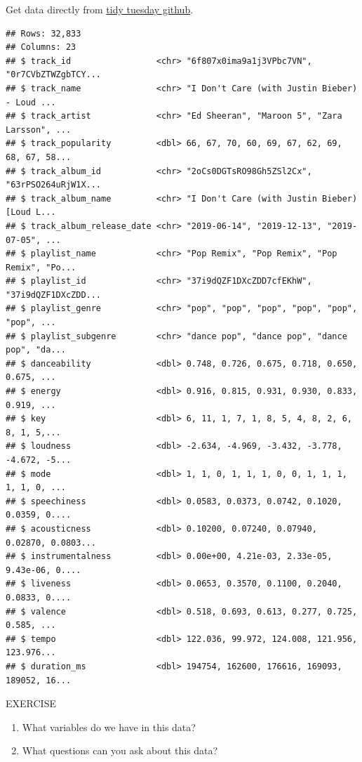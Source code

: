 \documentclass[
]{book}
\begin{document}
Get data directly from \href{https://raw.githubusercontent.com/rfordatascience/tidytuesday/master/data/2020/2020-01-21/spotify_songs.csv}{tidy tuesday github}.

\begin{verbatim}
## Rows: 32,833
## Columns: 23
## $ track_id                 <chr> "6f807x0ima9a1j3VPbc7VN", "0r7CVbZTWZgbTCY...
## $ track_name               <chr> "I Don't Care (with Justin Bieber) - Loud ...
## $ track_artist             <chr> "Ed Sheeran", "Maroon 5", "Zara Larsson", ...
## $ track_popularity         <dbl> 66, 67, 70, 60, 69, 67, 62, 69, 68, 67, 58...
## $ track_album_id           <chr> "2oCs0DGTsRO98Gh5ZSl2Cx", "63rPSO264uRjW1X...
## $ track_album_name         <chr> "I Don't Care (with Justin Bieber) [Loud L...
## $ track_album_release_date <chr> "2019-06-14", "2019-12-13", "2019-07-05", ...
## $ playlist_name            <chr> "Pop Remix", "Pop Remix", "Pop Remix", "Po...
## $ playlist_id              <chr> "37i9dQZF1DXcZDD7cfEKhW", "37i9dQZF1DXcZDD...
## $ playlist_genre           <chr> "pop", "pop", "pop", "pop", "pop", "pop", ...
## $ playlist_subgenre        <chr> "dance pop", "dance pop", "dance pop", "da...
## $ danceability             <dbl> 0.748, 0.726, 0.675, 0.718, 0.650, 0.675, ...
## $ energy                   <dbl> 0.916, 0.815, 0.931, 0.930, 0.833, 0.919, ...
## $ key                      <dbl> 6, 11, 1, 7, 1, 8, 5, 4, 8, 2, 6, 8, 1, 5,...
## $ loudness                 <dbl> -2.634, -4.969, -3.432, -3.778, -4.672, -5...
## $ mode                     <dbl> 1, 1, 0, 1, 1, 1, 0, 0, 1, 1, 1, 1, 1, 0, ...
## $ speechiness              <dbl> 0.0583, 0.0373, 0.0742, 0.1020, 0.0359, 0....
## $ acousticness             <dbl> 0.10200, 0.07240, 0.07940, 0.02870, 0.0803...
## $ instrumentalness         <dbl> 0.00e+00, 4.21e-03, 2.33e-05, 9.43e-06, 0....
## $ liveness                 <dbl> 0.0653, 0.3570, 0.1100, 0.2040, 0.0833, 0....
## $ valence                  <dbl> 0.518, 0.693, 0.613, 0.277, 0.725, 0.585, ...
## $ tempo                    <dbl> 122.036, 99.972, 124.008, 121.956, 123.976...
## $ duration_ms              <dbl> 194754, 162600, 176616, 169093, 189052, 16...
\end{verbatim}

EXERCISE

\begin{enumerate}
\def\labelenumi{\arabic{enumi})}
\item
  What variables do we have in this data?
\item
  What questions can you ask about this data?
\end{enumerate}
\end{document}
